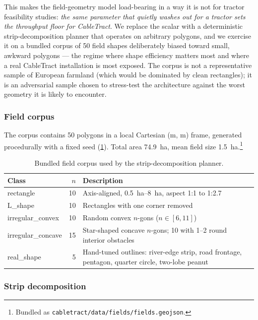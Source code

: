 \documentclass[11pt,a4paper]{article}
\begin{document}
This makes the field-geometry model load-bearing in a way it is not for tractor feasibility studies: \emph{the same parameter that quietly washes out for a tractor sets the throughput floor for CableTract}. We replace the scalar with a deterministic strip-decomposition planner that operates on arbitrary polygons, and we exercise it on a bundled corpus of 50 field shapes deliberately biased toward small, awkward polygons --- the regime where shape efficiency matters most and where a real CableTract installation is most exposed. The corpus is not a representative sample of European farmland (which would be dominated by clean rectangles); it is an adversarial sample chosen to stress-test the architecture against the worst geometry it is likely to encounter.

\subsubsection{Field corpus}\label{sec:corpus}

The corpus contains 50 polygons in a local Cartesian (m, m) frame, generated procedurally with a fixed seed (\cref{tab:corpus}). Total area \SI{74.9}{\hectare}, mean field size \SI{1.5}{\hectare}.\footnote{Bundled as \texttt{cabletract/data/fields/fields.geojson}.}

\begin{table}[H]
\centering\small
\caption{Bundled field corpus used by the strip-decomposition planner.}\label{tab:corpus}
\begin{tabularx}{\textwidth}{lrX}
\toprule
Class & $n$ & Description \\
\midrule
rectangle           & 10 & Axis-aligned, \SIrange{0.5}{8}{\hectare}, aspect 1:1 to 1:2.7 \\
L\_shape            & 10 & Rectangles with one corner removed \\
irregular\_convex   & 10 & Random convex $n$-gons ($n \in [6,11]$) \\
irregular\_concave  & 15 & Star-shaped concave $n$-gons; 10 with 1--2 round interior obstacles \\
real\_shape         & 5  & Hand-tuned outlines: river-edge strip, road frontage, pentagon, quarter circle, two-lobe peanut \\
\bottomrule
\end{tabularx}
\end{table}

\subsubsection{Strip decomposition}\label{sec:strip}
\end{document}
